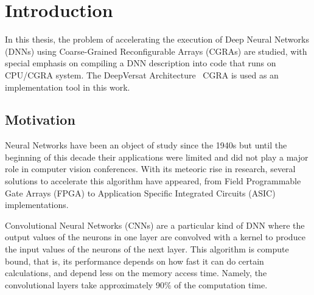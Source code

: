 
\chapter{Introduction}
\label{chapter:introduction}




In this thesis, the problem of accelerating the execution of Deep Neural
Networks (DNNs) using Coarse-Grained Reconfigurable Arrays (CGRAs) are studied,
with special emphasis on compiling a DNN description into code that runs on
CPU/CGRA system. The DeepVersat Architecture~\cite{valter:deepversat} CGRA is used as an
implementation tool in this work.


\section{Motivation}
\label{section:motivation}

Neural Networks have been an object of study since the 1940s but until the
beginning of this decade their applications were limited and did not play a
major role in computer vision conferences. With its meteoric rise in research,
several solutions to accelerate this algorithm have appeared, from Field Programmable Gate Arrays (FPGA) to
Application Specific Integrated Circuits (ASIC) implementations.

Convolutional Neural Networks (CNNs) are a particular kind of DNN where the output
values of the neurons in one layer are convolved with a kernel to produce the
input values of the neurons of the next layer. This algorithm is compute bound,
that is, its performance depends on how fast it can do certain calculations, and
depend less on the memory access time. Namely, the convolutional layers take
approximately 90$\%$ of the computation time.

